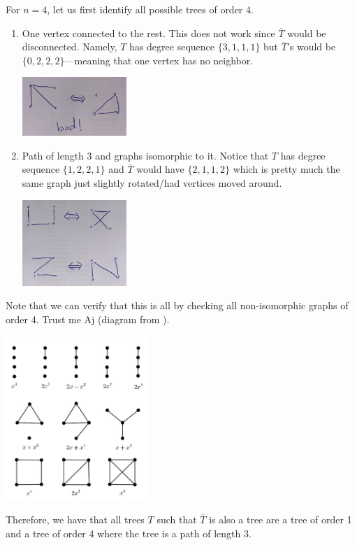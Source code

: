 \begin{solution}
    For \(n=4\), let us first identify all possible trees of order 4. 
    \begin{enumerate}
      \item One vertex connected to the rest. This does not work since
        \(\overline{T}\) would be disconnected. Namely, \(T\) has
        degree sequence \(\{3, 1, 1, 1\}\) but \(\overline{T}\)'s would be
        \(\{0, 2, 2, 2\}\)---meaning that one vertex has no neighbor.
        \begin{center}
          \includegraphics[width=0.31\textwidth]{figures/bad-p2}
        \end{center}
      \item Path of length 3 and graphs isomorphic to it. Notice that \(T\) has
        degree sequence \(\{1, 2, 2, 1\}\) and \(\overline{T}\) would have
        \(\{2, 1, 1, 2\}\) which is pretty much the same graph just slightly
        rotated/had vertices moved around.
        \begin{center}
          \includegraphics[width=0.31\textwidth]{figures/goodp2}
        \end{center}
    \end{enumerate}
    Note that we can verify that this is all by checking all non-isomorphic 
    graphs of order 4. Trust me Aj (diagram from \cite{sym13040710}).
    \begin{center}
      \includegraphics[width=0.4\textwidth]{figures/all4}
    \end{center}

    Therefore, we have that all trees \(T\) such that \(\overline{T}\) is also a
    tree are a tree of order 1 and a tree of order 4 where the tree is a path of
    length 3.
  \end{solution}
